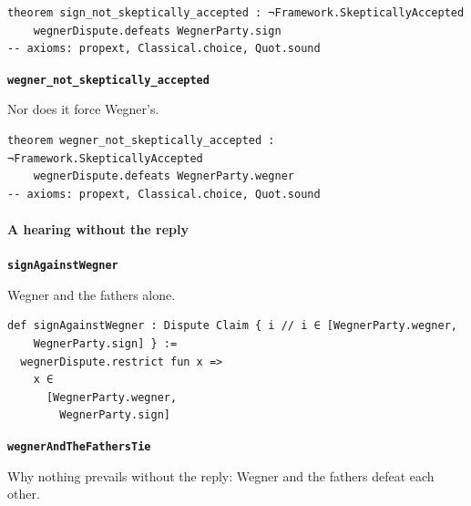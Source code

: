 \documentclass[11pt]{article}
\begin{document}
{\small\begin{verbatim}
theorem sign_not_skeptically_accepted : ¬Framework.SkepticallyAccepted
    wegnerDispute.defeats WegnerParty.sign
-- axioms: propext, Classical.choice, Quot.sound
\end{verbatim}}
\par\medskip\noindent\textbf{\texttt{wegner\_\allowbreak{}not\_\allowbreak{}skeptically\_\allowbreak{}accepted}}\par\nobreak\noindent
Nor does it force Wegner's.

{\small\begin{verbatim}
theorem wegner_not_skeptically_accepted : ¬Framework.SkepticallyAccepted
    wegnerDispute.defeats WegnerParty.wegner
-- axioms: propext, Classical.choice, Quot.sound
\end{verbatim}}
\paragraph*{A hearing without the reply}
\leavevmode\par
\par\medskip\noindent\textbf{\texttt{sign\allowbreak{}Against\allowbreak{}Wegner}}\par\nobreak\noindent
Wegner and the fathers alone.

{\small\begin{verbatim}
def signAgainstWegner : Dispute Claim { i // i ∈ [WegnerParty.wegner,
    WegnerParty.sign] } :=
  wegnerDispute.restrict fun x =>
    x ∈
      [WegnerParty.wegner,
        WegnerParty.sign]
\end{verbatim}}
\par\medskip\noindent\textbf{\texttt{wegner\allowbreak{}And\allowbreak{}The\allowbreak{}Fathers\allowbreak{}Tie}}\par\nobreak\noindent
Why nothing prevails without the reply: Wegner and the fathers defeat each other.
\end{document}
